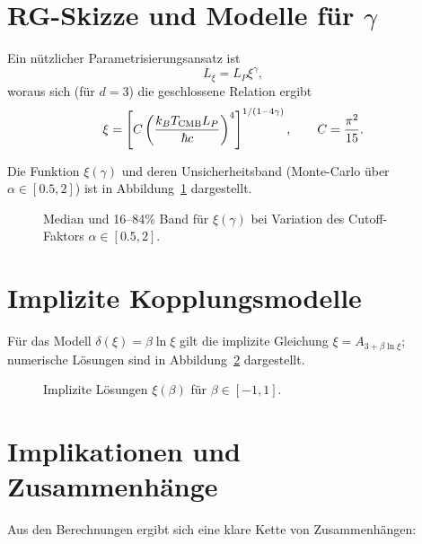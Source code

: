 \documentclass[12pt,a4paper]{article}
\begin{document}
	\section{RG-Skizze und Modelle für $\gamma$}
	Ein nützlicher Parametrisierungsansatz ist
	\begin{equation}
		L_\xi = L_P\xi^{\gamma},
	\end{equation}
	woraus sich (für $d=3$) die geschlossene Relation ergibt
	\begin{equation}
		\xi = \left[ C \left(\frac{k_B T_{\rm CMB} L_P}{\hbar c}\right)^4 \right]^{1/(1-4\gamma)},\qquad C=\frac{\pi^2}{15}.
	\end{equation}
	
	Die Funktion $\xi(\gamma)$ und deren Unsicherheitsband (Monte-Carlo über $\alpha\in[0.5,2]$) ist in Abbildung~\ref{fig:xi_gamma_mc} dargestellt.
	
	\begin{figure}[htbp]
		\centering

		\caption{Median und 16--84\% Band für $\xi(\gamma)$ bei Variation des Cutoff-Faktors $\alpha\in[0.5,2]$.}
		\label{fig:xi_gamma_mc}
	\end{figure}
	
	\section{Implizite Kopplungsmodelle}
	Für das Modell $\delta(\xi)=\beta\ln\xi$ gilt die implizite Gleichung $\xi=A_{3+\beta\ln\xi}$; numerische Lösungen sind in Abbildung~\ref{fig:xi_vs_beta} dargestellt.
	
	\begin{figure}[htbp]
		\centering

		\caption{Implizite Lösungen $\xi(\beta)$ für $\beta\in[-1,1]$.}
		\label{fig:xi_vs_beta}
	\end{figure}
	
	\section{Implikationen und Zusammenhänge}
	\label{sec:discussion}
	
	Aus den Berechnungen ergibt sich eine klare Kette von Zusammenhängen:
	
\end{document}

